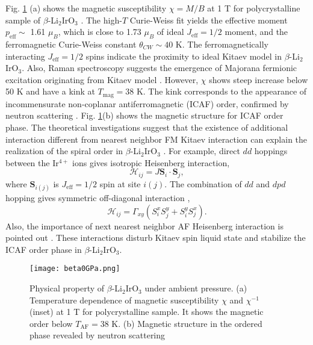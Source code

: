 Fig. \ref{beta0GPa} (a) shows the magnetic susceptibility $\chi = M/B$ at 1 T for polycrystalline sample of $\beta$-Li$_2$IrO$_3$ \cite{takayama2015hyperhoneycomb}.
The high-$T$ Curie-Weiss fit yields the effective moment $p_{\mathrm{eff}} \sim$ 1.61 $\mu_B$, which is close to 1.73 $\mu_B$ of ideal $J_{\mathrm{eff}} = 1/2$ moment,
and the ferromagnetic Curie-Weiss constant $\theta_{CW} \sim 40$ K.
The ferromagnetically interacting $J_{\mathrm{eff}} = 1/2$ spins indicate the proximity to ideal Kitaev model in $\beta$-Li$_2$IrO$_3$.
Also, Raman spectroscopy suggests the emergence of Majorana fermionic excitation originating from Kitaev model \cite{glamazda2016raman}.
However, $\chi$ shows steep increase below 50 K and have a kink at $T_\mathrm{mag} = 38$ K.
The kink corresponds to the appearance of incommensurate non-coplanar antiferromagnetic (ICAF) order, confirmed by neutron scattering \cite{Biffin2014}.
Fig. \ref{beta0GPa}(b) shows the magnetic structure for ICAF order phase.
The theoretical investigations suggest that the existence of additional interaction different from nearest neighbor FM Kitaev interaction
can explain the realization of the spiral order in $\beta$-Li$_2$IrO$_3$ \cite{Lee2015}.
For example, direct $dd$ hoppings between the Ir$^{4+}$ ions gives isotropic Heisenberg interaction,
\begin{equation}
\mathcal{H}_{ij} = J\bm{S}_i\cdot\bm{S}_j,
\end{equation}
where $\bm{S}_{i(j)}$ is  $J_{\mathrm{eff}} = 1/2$ spin at site $i(j)$.
The combination of $dd$ and $dpd$ hopping gives symmetric off-diagonal interaction \cite{Nasu2014},
\begin{equation}
\mathcal{H}_{ij} = \Gamma_{xy} (S^x_iS^y_j + S^y_iS^x_j).
\label{symoff}
\end{equation}
Also, the importance of next nearest neighbor AF Heisenberg interaction is pointed out \cite{Katukuri2016}.
These interactions disturb Kitaev spin liquid state and stabilize the ICAF order phase in $\beta$-Li$_2$IrO$_3$.

\begin{figure}
  \centering
  \texttt{[image: beta0GPa.png]}
  \caption{Physical property of $\beta$-Li$_2$IrO$_3$ under ambient pressure.
  (a) Temperature dependence of magnetic susceptibility $\chi$ and $\chi^{-1}$ (inset) at 1 T for polycrystalline sample\cite{takayama2015hyperhoneycomb}.
  It shows the magnetic order below $T_{\mathrm{AF}} = 38$ K.
  (b) Magnetic structure in the ordered phase revealed by neutron scattering \cite{Biffin2014}}
  \label{beta0GPa}
\end{figure}

